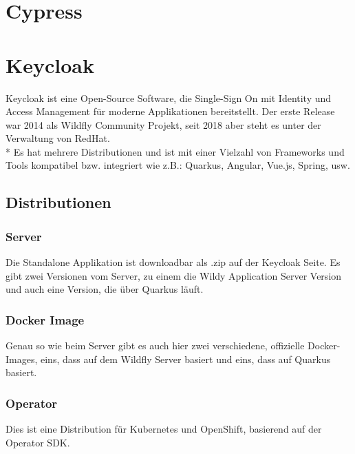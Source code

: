 \section{Cypress}

\section{Keycloak}
\author{Benjamin Besic}
Keycloak ist eine Open-Source Software, die Single-Sign On mit Identity und Access Management für moderne Applikationen bereitstellt. Der erste Release war 2014 als Wildfly Community Projekt, seit 2018 aber steht es unter der Verwaltung von RedHat. \cite{KeycloakWiki}  \\* 
Es hat mehrere Distributionen und ist mit einer Vielzahl von Frameworks und Tools kompatibel bzw. integriert wie z.B.: Quarkus, Angular, Vue.js, Spring, usw. \cite{KeyCloakDZone}

\subsection{Distributionen}
\subsubsection{Server}
Die Standalone Applikation ist downloadbar als .zip auf der Keycloak Seite. Es gibt zwei Versionen vom Server, zu einem die Wildy Application Server Version und auch eine Version, die über Quarkus läuft.
\subsubsection{Docker Image}
Genau so wie beim Server gibt es auch hier zwei verschiedene, offizielle Docker-Images, eins, dass auf dem Wildfly Server basiert und eins, dass auf Quarkus basiert.
\subsubsection{Operator}
Dies ist eine Distribution für Kubernetes und OpenShift, basierend auf der Operator SDK. \cite{KeyCloakDZone}
